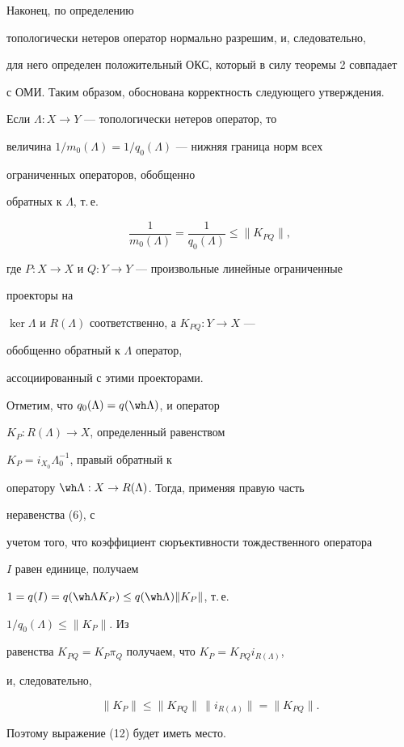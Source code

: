 Наконец, по определению  


топологически нетеров оператор нормально разрешим, и, следовательно,  


для него определен положительный ОКС, который в силу теоремы 2 совпадает 


с ОМИ. Таким образом, обоснована корректность следующего утверждения. 


 


\begin{thm} Если $\Lambda:X\to Y$ --- топологически нетеров оператор, то 


величина $1/m_0(\Lambda)=1/q_0(\Lambda)$ --- нижняя граница норм всех 


ограниченных операторов, обобщенно 


обратных к $\Lambda$, т.\,е. 


\begin{equation} 


\frac{1}{m_0(\Lambda)}=\frac{1}{q_0(\Lambda)} 


\le\|K_{PQ}\|, 


\end{equation} 


где $P:X\to X$ и $Q:Y\to Y$ --- произвольные линейные ограниченные 


проекторы на  


$\ker\Lambda$ и $R(\Lambda)$ соответственно, а $K_{PQ}:Y\to X$ --- 


обобщенно обратный к $\Lambda$ оператор, 


ассоциированный с этими проекторами.  


\end{thm} 


\begin{pf} Отметим, что $q_0(\Lambda)=q(\wh\Lambda)$, и оператор 


$K_P:R(\Lambda)\to X$, определенный равенством 


$K_P=i_{X_0}\Lambda^{-1}_0$, правый обратный к  


оператору $\wh\Lambda:X\to R(\Lambda)$. Тогда, применяя правую часть 


неравенства (6), с 


учетом того, что коэффициент сюръективности тождественного оператора 


$I$ равен единице, получаем 


$1=q(I)=q(\wh\Lambda K_P)\le q(\wh\Lambda)\|K_P\|$, т.\,е. 


$1/q_0(\Lambda)\le\|K_P\|$. Из 


равенства $K_{PQ}=K_P\pi_Q$ получаем, что $K_P=K_{PQ}i_{R(\Lambda)}$, 


и, следовательно, 


\begin{equation} 


\|K_P\|\le\|K_{PQ}\|\,\|i_{R(\Lambda)}\|=\|K_{PQ}\|. 


\end{equation} 


Поэтому выражение (12) будет иметь место. 


\end{pf} 


